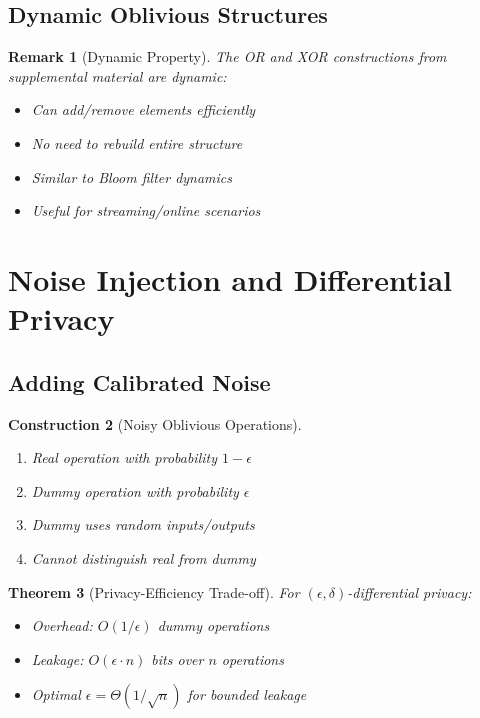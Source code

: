 \documentclass[11pt,final]{article}
\newtheorem{theorem}{Theorem}[section]
\newtheorem{remark}[theorem]{Remark}
\newtheorem{construction}[theorem]{Construction}
\begin{document}
\subsection{Dynamic Oblivious Structures}

\begin{remark}[Dynamic Property]
The OR and XOR constructions from supplemental material are dynamic:
\begin{itemize}
    \item Can add/remove elements efficiently
    \item No need to rebuild entire structure
    \item Similar to Bloom filter dynamics
    \item Useful for streaming/online scenarios
\end{itemize}
\end{remark}

\section{Noise Injection and Differential Privacy}

\subsection{Adding Calibrated Noise}

\begin{construction}[Noisy Oblivious Operations]
\begin{enumerate}
    \item Real operation with probability $1-\epsilon$
    \item Dummy operation with probability $\epsilon$
    \item Dummy uses random inputs/outputs
    \item Cannot distinguish real from dummy
\end{enumerate}
\end{construction}

\begin{theorem}[Privacy-Efficiency Trade-off]
For $(\epsilon, \delta)$-differential privacy:
\begin{itemize}
    \item Overhead: $O(1/\epsilon)$ dummy operations
    \item Leakage: $O(\epsilon \cdot n)$ bits over $n$ operations
    \item Optimal $\epsilon = \Theta(1/\sqrt{n})$ for bounded leakage
\end{itemize}
\end{theorem}
\end{document}
